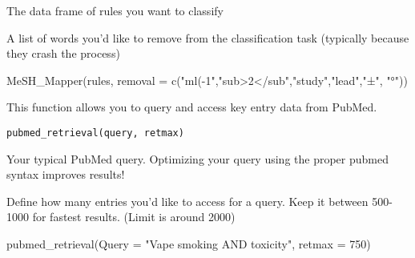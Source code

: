 \documentclass[a4paper]{book}
\begin{document}
%
\begin{Arguments}
\begin{ldescription}
\item[\code{word}] The data frame of rules you want to classify

\item[\code{removal}] A list of words you'd like to remove from the classification task (typically because they crash the process)
\end{ldescription}
\end{Arguments}
%
\begin{Examples}
\begin{ExampleCode}
MeSH_Mapper(rules, removal = c("ml(-1","sub>2</sub","study","lead","±", "°"))
\end{ExampleCode}
\end{Examples}
%
\begin{Description}\relax
This function allows you to query and access key entry data from PubMed.
\end{Description}
%
\begin{Usage}
\begin{verbatim}
pubmed_retrieval(query, retmax)
\end{verbatim}
\end{Usage}
%
\begin{Arguments}
\begin{ldescription}
\item[\code{query}] Your typical PubMed query. Optimizing your query using the proper pubmed syntax improves results!

\item[\code{retmax}] Define how many entries you'd like to access for a query. Keep it between 500-1000 for fastest results. (Limit is around 2000)
\end{ldescription}
\end{Arguments}
%
\begin{Examples}
\begin{ExampleCode}
pubmed_retrieval(Query = "Vape smoking AND toxicity", retmax = 750)
\end{ExampleCode}
\end{Examples}
\end{document}
